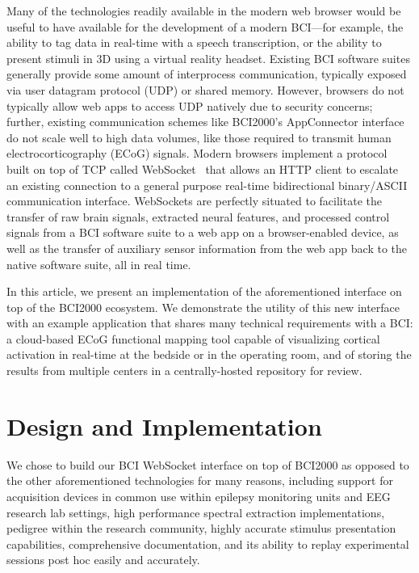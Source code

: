 \documentclass[utf8]{frontiersSCNS}
\begin{document}
Many of the technologies readily available in the modern web browser would be useful to have available for the development of a modern BCI---for example, the ability to tag data in real-time with a speech transcription, or the ability to present stimuli in 3D using a virtual reality headset.
Existing BCI software suites generally provide some amount of interprocess communication, typically exposed via user datagram protocol (UDP) or shared memory.
However, browsers do not typically allow web apps to access UDP natively due to security concerns; further, existing communication schemes like BCI2000’s AppConnector interface do not scale well to high data volumes, like those required to transmit human electrocorticography (ECoG) signals.
Modern browsers implement a protocol built on top of TCP called WebSocket~\citep{fette_websocket_2011} that allows an HTTP client to escalate an existing connection to a general purpose real-time bidirectional binary/ASCII communication interface.
WebSockets are perfectly situated to facilitate the transfer of raw brain signals, extracted neural features, and processed control signals from a BCI software suite to a web app on a browser-enabled device, as well as the transfer of auxiliary sensor information from the web app back to the native software suite, all in real time.

In this article, we present an implementation of the aforementioned interface on top of the BCI2000 ecosystem.
We demonstrate the utility of this new interface with an example application that shares many technical requirements with a BCI: a cloud-based ECoG functional mapping tool capable of visualizing cortical activation in real-time at the bedside or in the operating room, and of storing the results from multiple centers in a centrally-hosted repository for review.



\section{Design and Implementation}

We chose to build our BCI WebSocket interface on top of BCI2000 as opposed to the other aforementioned technologies for many reasons, including support for acquisition devices in common use within epilepsy monitoring units and EEG research lab settings, high performance spectral extraction implementations, pedigree within the research community, highly accurate stimulus presentation capabilities, comprehensive documentation, and its ability to replay experimental sessions post hoc easily and accurately.
\end{document}
